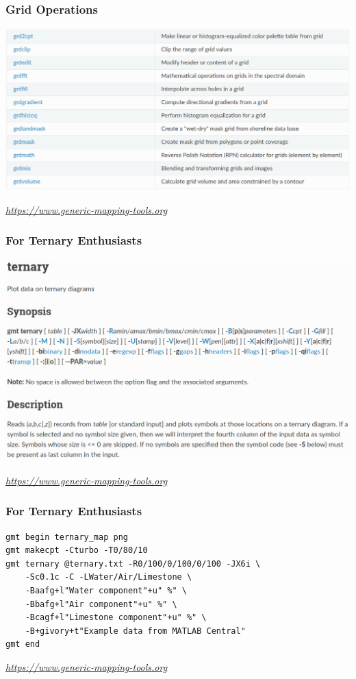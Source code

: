 \documentclass[unknownkeysallowed]{beamer}
\begin{document}
\begin{frame}[fragile=singleslide]
\frametitle{Grid Operations}
	\begin{center}
		\includegraphics[width=\textwidth]{../figures/gmt_grd_ops.png}	
	\end{center}
	\vspace{-0.5cm}
	\begin{flushright}
	\tiny{\emph{\url{https://www.generic-mapping-tools.org}}}
	\end{flushright}	
\end{frame}

\begin{frame}[fragile=singleslide]
\frametitle{For Ternary Enthusiasts}
	\begin{center}
		\includegraphics[width=.9\textwidth]{../figures/gmt_ternary.png}	
	\end{center}
	\vspace{-0.5cm}
	\begin{flushright}
	\tiny{\emph{\url{https://www.generic-mapping-tools.org}}}
	\end{flushright}	
\end{frame}

\begin{frame}[fragile=singleslide]
\frametitle{For Ternary Enthusiasts}
{\scriptsize
	\begin{verbatim}
gmt begin ternary_map png
gmt makecpt -Cturbo -T0/80/10
gmt ternary @ternary.txt -R0/100/0/100/0/100 -JX6i \
    -Sc0.1c -C -LWater/Air/Limestone \
    -Baafg+l"Water component"+u" %" \
    -Bbafg+l"Air component"+u" %" \
    -Bcagf+l"Limestone component"+u" %" \
    -B+givory+t"Example data from MATLAB Central"
gmt end
	\end{verbatim}	
}
	\begin{flushright}
	\tiny{\emph{\url{https://www.generic-mapping-tools.org}}}
	\end{flushright}	
\end{frame}
\end{document}

